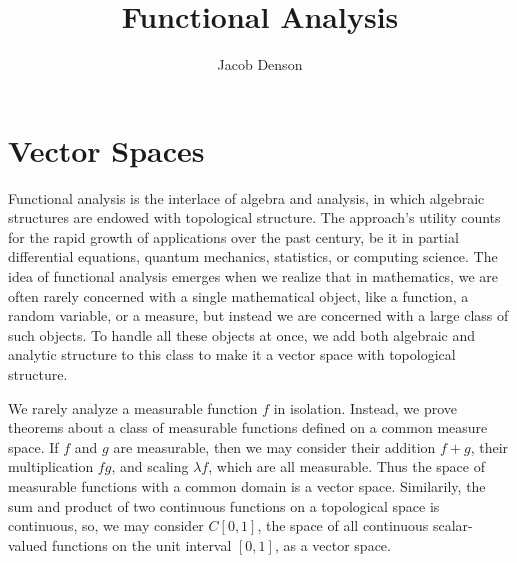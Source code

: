 


\title{Functional Analysis}
\author{Jacob Denson}



\maketitle
\tableofcontents
{}

\part{Vector Spaces}

Functional analysis is the interlace of algebra and analysis, in which algebraic structures are endowed with topological structure. The approach's utility counts for the rapid growth of applications over the past century, be it in partial differential equations, quantum mechanics, statistics, or computing science. The idea of functional analysis emerges when we realize that in mathematics, we are often rarely concerned with a single mathematical object, like a function, a random variable, or a measure, but instead we are concerned with a large class of such objects. To handle all these objects at once, we add both algebraic and analytic structure to this class to make it a vector space with topological structure.

\begin{example}
    We rarely analyze a measurable function $f$ in isolation. Instead, we prove theorems about a class of measurable functions defined on a common measure space. If $f$ and $g$ are measurable, then we may consider their addition $f + g$, their multiplication $fg$, and scaling $\lambda f$, which are all measurable. Thus the space of measurable functions with a common domain is a vector space. Similarily, the sum and product of two continuous functions on a topological space is continuous, so, we may consider $C[0,1]$, the space of all continuous scalar-valued functions on the unit interval $[0,1]$, as a vector space.
\end{example}

